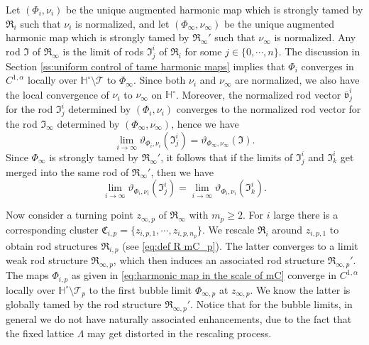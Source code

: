 \documentclass[a4paper,11pt]{amsart}
\theoremstyle{definition}
\numberwithin{equation}{section}
\newcommand{\dH}{\mathbb{H}}
\newcommand{\mv} {\mathfrak v}
\newcommand{\mI} {\mathfrak I}
\newcommand{\mR} {\mathfrak R}
\newcommand{\mC} {\mathfrak C}
\begin{document}
Let $(\Phi_i, \nu_i)$ be the unique augmented harmonic map which is strongly tamed by $\mR_i$ such that $\nu_i$ is normalized, and let $(\Phi_\infty, \nu_\infty)$ be the unique augmented harmonic map which is strongly tamed by $\mR_\infty'$ such that $\nu_\infty$ is normalized. Any rod $\mI$ of $\mR_\infty$ is the limit of rods $\mI^i_j$ of $\mR_i$ for some $j\in\{0, \cdots, n\}$. 
The discussion in Section \ref{ss:uniform control of tame harmonic maps} implies that $\Phi_i$ converges in $C^{1, \alpha}$ locally over $\dH^\circ\setminus \mathcal T$ to $\Phi_\infty$. Since both $\nu_i$ and $\nu_\infty$ are normalized, we also have the local convergence of $\nu_i$ to $\nu_\infty$ on $\dH^\circ$. Moreover, the normalized rod vector $\overline {\mv}_j^i$ for the rod $\mI_j^i$ determined by $(\Phi_i, \nu_i)$  converges to the normalized rod vector for the rod $\mI_\infty$ determined by $(\Phi_\infty, \nu_\infty)$, hence we have 
\begin{equation}\label{e:angle continuity}
    \lim_{i\rightarrow\infty}\vartheta_{\Phi_i, \nu_i}(\mI_j^i)=\vartheta_{\Phi_\infty, \nu_\infty}(\mI).
\end{equation}
Since $\Phi_\infty$ is strongly tamed by $\mR_\infty'$, it follows that if the limits of $\mI_{j}^i$ and $\mI_{k}^i$ get merged into the same rod of $\mR_\infty'$, then we have
\begin{equation}\lim_{i\rightarrow\infty}\vartheta_{\Phi_i, \nu_i}(\mI_j^i)=\lim_{i\rightarrow\infty}\vartheta_{\Phi_i, \nu_i}(\mI_k^i).
\end{equation}


Now consider a turning point $z_{\infty, p}$ of $\mR_{\infty}$ with $m_p\geq 2$. For $i$ large there is a corresponding cluster $\mC_{i,p}=\{z_{i, p, 1}, \cdots,z_{i,p,n_p}\}$. We rescale  $\mR_{i}$ around $z_{i, p,1}$ to obtain rod structures $\mR_{{i, p}}$ (see \eqref{eq:def R mC_p}). The latter converges to a limit weak rod structure $\mR_{\infty, p}$, which then induces an associated rod structure $\mR_{\infty, p}'$. The maps $\Phi_{i, p}$ as given in \eqref{eq:harmonic map in the scale of mC} converge in $C^{1, \alpha}$ locally over $\dH^\circ\setminus \mathcal T_{p}$ to the first bubble  limit $\Phi_{\infty, p}$ at $z_{\infty, p}$. 
We know the latter is globally tamed by the rod structure $\mR_{\infty, p}'$. Notice that for the bubble limits, in general we  do not have naturally associated enhancements, due to the fact that the fixed lattice $\Lambda$ may get distorted in the rescaling process. 
\end{document}
